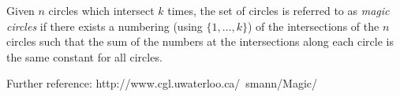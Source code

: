 \documentclass[12pt]{article}
\begin{document}
Given $n$ circles which intersect $k$ times, the set of circles is referred to as \emph{magic circles} if there exists a numbering (using $\{1,\ldots,k\}$) of the intersections of the $n$ circles such that the sum of the numbers at the intersections along each circle is the same constant for all circles.

Further reference:
http://www.cgl.uwaterloo.ca/~smann/Magic/
\end{document}
